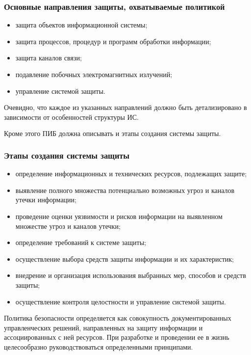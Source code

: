 \begin{frame}
\frametitle{Основные направления защиты, охватываемые политикой}
\begin{itemize}
    \item защита объектов информационной системы;
    \item защита процессов, процедур и программ обработки информации;
    \item защита каналов связи;
    \item подавление побочных электромагнитных излучений;
    \item управление системой защиты.
\end{itemize}
\end{frame}

Очевидно, что каждое из указанных направлений должно быть детализировано в зависимости от особенностей структуры ИС.

Кроме этого ПИБ должна описывать и этапы создания системы защиты.

\begin{frame}
\frametitle{Этапы создания системы защиты}
\begin{itemize}
    \item определение информационных и технических ресурсов, подлежащих защите;
    \item выявление полного множества потенциально возможных угроз и каналов утечки информации;
    \item проведение оценки уязвимости и рисков информации на выявленном множестве угроз и каналов утечки;
    \item определение требований к системе защиты;
    \item осуществление выбора средств защиты информации и их характеристик;
    \item внедрение и организация использования выбранных мер, способов и средств защиты;
    \item осуществление контроля целостности и управление системой защиты.
\end{itemize}
\end{frame}

Политика безопасности определяется как совокупность документированных управленческих решений, направленных на защиту информации и ассоциированных с ней ресурсов. При разработке и проведении ее в жизнь целесообразно руководствоваться определенными принципами.

